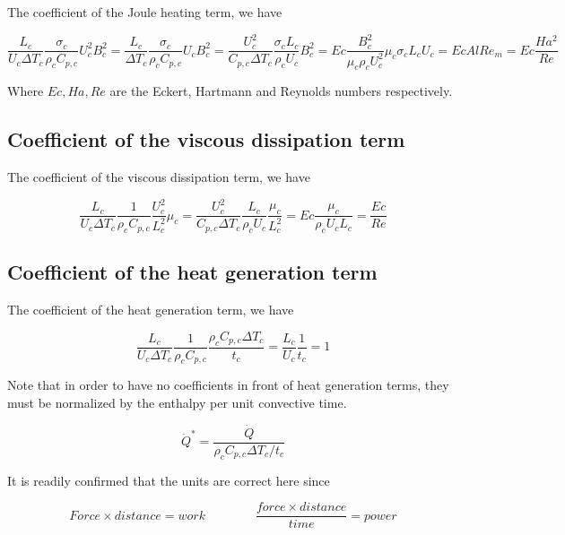 \documentclass[11pt]{article}
\begin{document}
The coefficient of the Joule heating term, we have

\begin{equation}
	\frac{L_c}{U_c \Delta T_c}
	\frac{\sigma_c}{\rho_c C_{p,c}}
	U_c^2 B_c^2
	=
	\frac{L_c}{\Delta T_c}
	\frac{\sigma_c}{\rho_c C_{p,c}}
	U_c B_c^2
	=
	\frac{U_c^2}{C_{p,c} \Delta T_c}
	\frac{\sigma_c L_c}{\rho_c U_c}
	B_c^2
	=
	Ec
	\frac{B_c^2}{\mu_c \rho_c U_c^2}
	\mu_c \sigma_c L_c U_c
	=
	Ec Al Re_m = Ec \frac{Ha^2}{Re}
\end{equation}

Where $Ec,Ha,Re$ are the Eckert, Hartmann and Reynolds numbers respectively.

\subsection{Coefficient of the viscous dissipation term}
The coefficient of the viscous dissipation term, we have

\begin{equation}
	\frac{L_c}{U_c \Delta T_c}
	\frac{1}{\rho_c C_{p,c}}
	\frac{U_c^2}{L_c^2}\mu_c
	=
	\frac{U_c^2}{C_{p,c} \Delta T_c}
	\frac{L_c}{\rho_c U_c}
	\frac{\mu_c}{L_c^2}
	=
	Ec
	\frac{\mu_c}{\rho_c U_c L_c}
	=
	\frac{Ec}{Re}
\end{equation}

\subsection{Coefficient of the heat generation term}
The coefficient of the heat generation term, we have

\begin{equation}
	\frac{L_c}{U_c \Delta T_c}
	\frac{1}{\rho_c C_{p,c}}
	\frac{\rho_c C_{p,c} \Delta T_c}{t_c}
	=
	\frac{L_c}{U_c}
	\frac{1}{t_c}
	= 1
\end{equation}

Note that in order to have no coefficients in front of heat generation terms, they must be normalized by the enthalpy per unit convective time.

\begin{equation}
	\dot{Q}^* = \frac{\dot{Q}}{\rho_c C_{p,c} \Delta T_c / t_c}
\end{equation}

It is readily confirmed that the units are correct here since 

\begin{equation}
	Force \times distance = work
	\qquad \qquad
	\frac{force \times distance}{time} = power
\end{equation}
\end{document}
